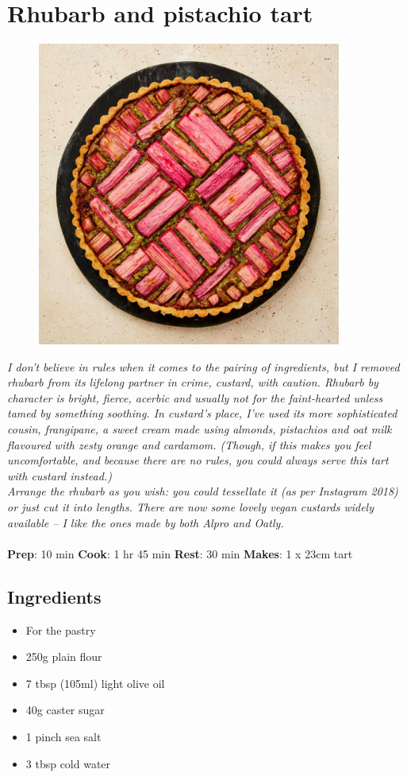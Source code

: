 \documentclass{book}
\begin{document}
\section{Rhubarb and pistachio tart}
\begin{figure}
\centering\includegraphics[width=10cm,height=10cm,keepaspectratio]{Recipe_Pictures/Rhubarb_and_pistachio_tart.png}
\end{figure}
\emph{I don’t believe in rules when it comes to the pairing of ingredients, but I removed rhubarb from its lifelong partner in crime, custard, with caution. Rhubarb by character is bright, fierce, acerbic and usually not for the faint-hearted unless tamed by something soothing. In custard’s place, I’ve used its more sophisticated cousin, frangipane, a sweet cream made using almonds, pistachios and oat milk flavoured with zesty orange and cardamom. (Though, if this makes you feel uncomfortable, and because there are no rules, you could always serve this tart with custard instead.)\\ 
Arrange the rhubarb as you wish: you could tessellate it (as per Instagram 2018) or just cut it into lengths. There are now some lovely vegan custards widely available – I like the ones made by both Alpro and Oatly.}\\\\ 
\textbf{Prep}: 10 min
\textbf{Cook}: 1 hr 45 min
\textbf{Rest}: 30 min
\textbf{Makes}: 1 x 23cm tart
\subsection*{Ingredients}
\begin{itemize}
\item For the pastry
\item 250g plain flour
\item 7 tbsp (105ml) light olive oil
\item 40g caster sugar
\item 1 pinch sea salt
\item 3 tbsp cold water
\end{itemize}
\end{document}
